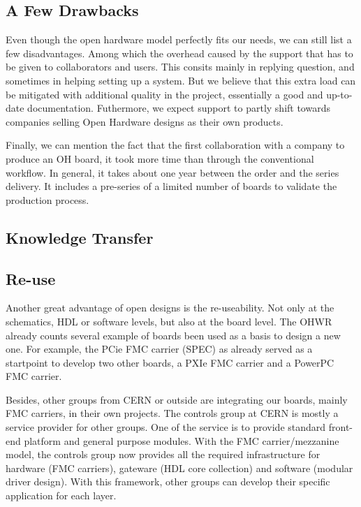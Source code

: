 \documentclass{JAC2003}
\begin{document}
\subsection{A Few Drawbacks}
Even though the open hardware model perfectly fits our needs, we can still list a few disadvantages.
Among which the overhead caused by the support that has to be given to collaborators and users. This consits mainly in replying question, and sometimes in helping setting up a system.
But we believe that this extra load can be mitigated with additional quality in the project, essentially a good and up-to-date documentation.
Futhermore, we expect support to partly shift towards companies selling Open Hardware designs as their own products.

Finally, we can mention the fact that the first collaboration with a company to produce an OH board, it took more time than through the conventional workflow.
In general, it takes about one year between the order and the series delivery.
It includes a pre-series of a limited number of boards to validate the production process.

\subsection{Knowledge Transfer}

\subsection{Re-use}
Another great advantage of open designs is the re-useability.
Not only at the schematics, HDL or software levels, but also at the board level.
The OHWR already counts several example of boards been used as a basis to design a new one.
For example, the PCie FMC carrier (SPEC) as already served as a startpoint to develop two other boards, a PXIe FMC carrier and a PowerPC FMC carrier.

Besides, other groups from CERN or outside are integrating our boards, mainly FMC carriers, in their own projects.
The controls group at CERN is mostly a service provider for other groups.
One of the service is to provide standard front-end platform and general purpose modules.
With the FMC carrier/mezzanine model, the controls group now provides all the required infrastructure for hardware (FMC carriers), gateware (HDL core collection) and software (modular driver design). With this framework, other groups can develop their specific application for each layer.
\end{document}
